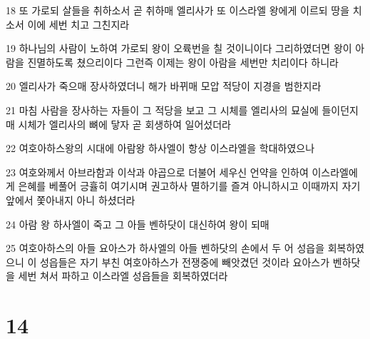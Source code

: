 \par 18 또 가로되 살들을 취하소서 곧 취하매 엘리사가 또 이스라엘 왕에게 이르되 땅을 치소서 이에 세번 치고 그친지라
\par 19 하나님의 사람이 노하여 가로되 왕이 오륙번을 칠 것이니이다 그리하였더면 왕이 아람을 진멸하도록 쳤으리이다 그런즉 이제는 왕이 아람을 세번만 치리이다 하니라
\par 20 엘리사가 죽으매 장사하였더니 해가 바뀌매 모압 적당이 지경을 범한지라
\par 21 마침 사람을 장사하는 자들이 그 적당을 보고 그 시체를 엘리사의 묘실에 들이던지매 시체가 엘리사의 뼈에 닿자 곧 회생하여 일어섰더라
\par 22 여호아하스왕의 시대에 아람왕 하사엘이 항상 이스라엘을 학대하였으나
\par 23 여호와께서 아브라함과 이삭과 야곱으로 더불어 세우신 언약을 인하여 이스라엘에게 은혜를 베풀어 긍휼히 여기시며 권고하사 멸하기를 즐겨 아니하시고 이때까지 자기 앞에서 쫓아내지 아니 하셨더라
\par 24 아람 왕 하사엘이 죽고 그 아들 벤하닷이 대신하여 왕이 되매
\par 25 여호아하스의 아들 요아스가 하사엘의 아들 벤하닷의 손에서 두 어 성읍을 회복하였으니 이 성읍들은 자기 부친 여호아하스가 전쟁중에 빼앗겼던 것이라 요아스가 벤하닷을 세번 쳐서 파하고 이스라엘 성읍들을 회복하였더라

\chapter{14}


